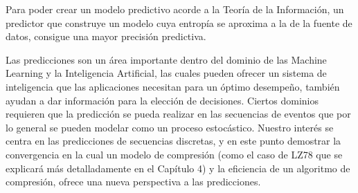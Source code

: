  













Para poder crear un modelo predictivo acorde a la Teoría de la Información, un predictor que construye un modelo cuya entropía se aproxima a la de la fuente de datos, consigue una mayor precisión predictiva. 


Las predicciones son un área importante dentro del dominio de las Machine Learning y la Inteligencia Artificial, las cuales pueden ofrecer un sistema de inteligencia que las aplicaciones necesitan para un óptimo desempeño, también ayudan a dar información para la elección de decisiones. Ciertos dominios requieren que la predicción se pueda realizar en las secuencias de eventos que por lo general se pueden modelar como un proceso estocástico. 
Nuestro interés se centra en las predicciones de secuencias discretas, y en este punto demostrar la convergencia en la  cual un modelo de compresión (como el caso de LZ78 que se explicará más detalladamente en el Capítulo 4) y la eficiencia de un algoritmo de compresión, ofrece una nueva perspectiva a las predicciones. 


